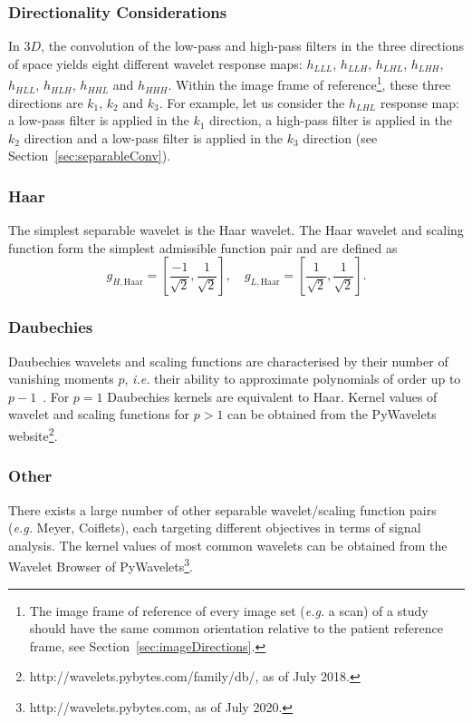 \documentclass[fleqn,a4paper,oneside,openany]{book}
\begin{document}
\subsubsection{Directionality Considerations}\label{sec:directionalityWT}
%
In 3$D$, the convolution of the low-pass and high-pass filters in the three directions of space yields eight different wavelet response maps:  $h_{LLL}$, $h_{LLH}$, $h_{LHL}$, $h_{LHH}$, $h_{HLL}$, $h_{HLH}$, $h_{HHL}$ and $h_{HHH}$. Within the image frame of reference\footnote{The image frame of reference of every image set (\textit{e.g.} a scan) of a study should have the same common orientation relative to the patient reference frame, see Section~\ref{sec:imageDirections}.}, these three directions are $k_1$, $k_2$ and $k_3$. For example, let us consider the $h_{LHL}$ response map: a low-pass filter is applied in the $k_1$ direction, a high-pass filter is applied in the $k_2$ direction and a low-pass filter is applied in the $k_3$ direction (see Section~\ref{sec:separableConv}).
%
\subsubsection{Haar}\label{sec:haar}
%
The simplest separable wavelet is the Haar wavelet.
The Haar wavelet and scaling function form the simplest admissible function pair and are defined as~\cite{Lee2018}
$$g_{H,\text{Haar}} = \left[ \frac{-1}{\sqrt{2}}, \frac{1}{\sqrt{2}}\right], \quad g_{L,\text{Haar}} = \left[ \frac{1}{\sqrt{2}}, \frac{1}{\sqrt{2}}\right].$$

\subsubsection{Daubechies}\label{sec:daubechies}
%
Daubechies wavelets and scaling functions are characterised by their number of vanishing moments $p$, \textit{i.e.} their ability to approximate polynomials of order up to $p-1$~\cite{Dau1992}.
For $p=1$ Daubechies kernels are equivalent to Haar.
Kernel values of wavelet and scaling functions for $p>1$ can be obtained from the PyWavelets website\footnote{http://wavelets.pybytes.com/family/db/, as of July 2018.}.
%
\subsubsection{Other}\label{sec:otherWavelets}
%
There exists a large number of other separable wavelet/scaling function pairs (\textit{e.g.} Meyer, Coiflets), each targeting different objectives in terms of signal analysis. The kernel values of most common wavelets can be obtained from the Wavelet Browser of PyWavelets\footnote{http://wavelets.pybytes.com, as of July 2020.}.
%
\end{document}
